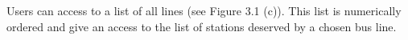 \documentclass[a4paper, 12pt]{report}
\begin{document}
Users can access to a list of all lines (see Figure 3.1 (c)). This list is numerically ordered and give an access to the list of stations deserved by a chosen bus line.


\begin{figure}[htp]
  \centering

\end{figure}
\end{document}
